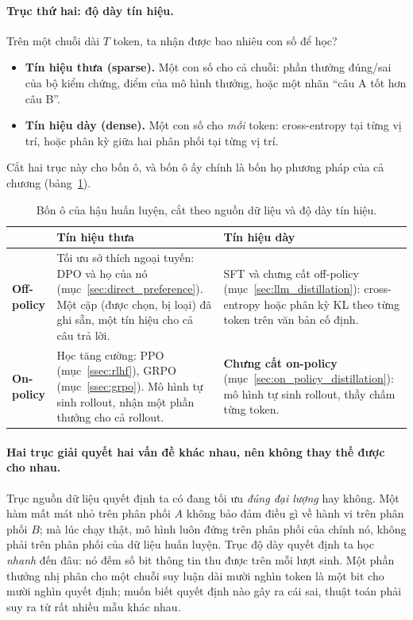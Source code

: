 \paragraph{Trục thứ hai: độ dày tín hiệu.} Trên một chuỗi dài $T$ token, ta nhận được bao nhiêu con số để học?
\begin{itemize}
	\item \textbf{Tín hiệu thưa (sparse).} Một con số cho cả chuỗi: phần thưởng đúng/sai của bộ kiểm chứng, điểm của mô hình thưởng, hoặc một nhãn ``câu A tốt hơn câu B''.
	\item \textbf{Tín hiệu dày (dense).} Một con số cho \emph{mỗi} token: cross-entropy tại từng vị trí, hoặc phân kỳ giữa hai phân phối tại từng vị trí.
\end{itemize}

Cắt hai trục này cho bốn ô, và bốn ô ấy chính là bốn họ phương pháp của cả chương (bảng~\ref{tab:post_training_quadrants}).

\begin{table}[H]
\centering\small
\caption{Bốn ô của hậu huấn luyện, cắt theo nguồn dữ liệu và độ dày tín hiệu.}
\label{tab:post_training_quadrants}
\begin{tabularx}{\textwidth}{@{}>{\raggedright\arraybackslash}p{2.3cm}XX@{}}
\toprule
 & \textbf{Tín hiệu thưa} & \textbf{Tín hiệu dày} \\
\midrule
\textbf{Off-policy} & Tối ưu sở thích ngoại tuyến: DPO và họ của nó (mục~\ref{sec:direct_preference}). Một cặp (được chọn, bị loại) đã ghi sẵn, một tín hiệu cho cả câu trả lời. & SFT và chưng cất off-policy (mục~\ref{sec:llm_distillation}): cross-entropy hoặc phân kỳ KL theo từng token trên văn bản cố định. \\
\addlinespace
\textbf{On-policy} & Học tăng cường: PPO (mục~\ref{ssec:rlhf}), GRPO (mục~\ref{ssec:grpo}). Mô hình tự sinh rollout, nhận một phần thưởng cho cả rollout. & \textbf{Chưng cất on-policy} (mục~\ref{sec:on_policy_distillation}): mô hình tự sinh rollout, thầy chấm từng token. \\
\bottomrule
\end{tabularx}
\end{table}

\paragraph{Hai trục giải quyết hai vấn đề khác nhau, nên không thay thế được cho nhau.} Trục nguồn dữ liệu quyết định ta có đang tối ưu \emph{đúng đại lượng} hay không. Một hàm mất mát nhỏ trên phân phối $A$ không bảo đảm điều gì về hành vi trên phân phối $B$; mà lúc chạy thật, mô hình luôn đứng trên phân phối của chính nó, không phải trên phân phối của dữ liệu huấn luyện. Trục độ dày quyết định ta học \emph{nhanh} đến đâu: nó đếm số bit thông tin thu được trên mỗi lượt sinh. Một phần thưởng nhị phân cho một chuỗi suy luận dài mười nghìn token là một bit cho mười nghìn quyết định; muốn biết quyết định nào gây ra cái sai, thuật toán phải suy ra từ rất nhiều mẫu khác nhau.

